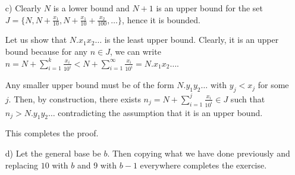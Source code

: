\documentclass[11pt]{article}
\newcommand{\bbN}{\mathbb{N}}
\renewcommand{\_}[1]{\underline{ #1 }}
\theoremstyle{definition}
\numberwithin{equation}{subsection}
\begin{document}
{\begin{enumerate}
Distributing the power of $10^{k+j}$, we see that
\[
y_l = 10^{k+j} \left(x-(N+\sum_{i=1}^{k-1} \frac{x_i}{10^i})\right)-9 \sum_{i=1}^j 10^i.
\]

Thus, $y_l=y_{k+j} = 10^j y_k - 9\displaystyle \sum_{i=1}^j 10^i=10^j y_k-10(10^j-1)$.

We have that $\forall j \in \bbN \cup \{0\}, 9\leq y_{k+j}<10$, since $\forall j \in \bbN \cup \{0\}, x_{k+j}=9$, and $x_{k+j} = \text{floor}(y_{k+j})$. Thus, we see that

\begin{align*}
9 &\leq 10^j y_k - 10(10^j - 1) < 10 \\
9 &\leq 10(10^{j-1} y_k - 10^j + 1) < 10 \\
\frac{9}{10} &\leq 10^{j-1} y_k - 10^j + 1 < 1 \\
-\frac{1}{10} &\leq 10^{j-1} y_k - 10^j < 0 \\
-\frac{1}{10} &\leq 10^{j-1} (y_k - 10) < 0 \\
-\frac{1}{10^j} &\leq y_k - 10 < 0 \\
10 - \frac{1}{10^j} &\leq y_k < 10.
\end{align*}

This is a contradiction, since the chain of inequalities is supposed to hold for all $j \in \bbN \cup \{0\}$. So for a given $y_k$, it is possible to find $j$ large enough such that the chain of inequalities fails (i.e. it violates trichotomy).

This completes the proof.

\item[c)] Clearly $N$ is a lower bound and $N+1$ is an upper bound for the set $J=\{N, N+\frac{x_1}{10}, N+\frac{x_1}{10}+\frac{x_2}{100},\dots\}$, hence it is bounded.

Let us show that $N.x_1x_2\dots $ is the least upper bound. Clearly, it is an upper bound because for any $n \in J$, we can write $n=N+\displaystyle \sum_{i=1}^k \frac{x_i}{10^i} < N + \displaystyle \sum_{i=1}^\infty \frac{x_i}{10^i} = N.x_1x_2\dots$.

Any smaller upper bound must be of the form $N.y_1y_2\dots$ with $y_j<x_j$ for some $j$. Then, by construction, there exists $n_j=N+\displaystyle \sum_{i=1}^j \frac{x_i}{10^i} \in J$ such that $n_j>N.y_1y_2\dots$ contradicting the assumption that it is an upper bound.

This completes the proof.

\item[d)] Let the general base be $b$. Then copying what we have done previously and replacing $10$ with $b$ and 9 with $b-1$ everywhere completes the exercise. 

\end{enumerate}
}
\end{document}
